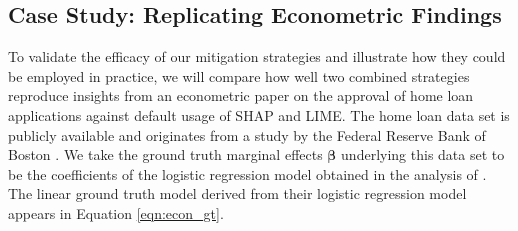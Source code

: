 \documentclass[12pt]{article}  %
\begin{document}
\vspace{-3mm}
\subsection{Case Study: Replicating Econometric Findings}
  \label{sec:case_study}\vspace{-3mm}
  To validate the efficacy of our mitigation strategies and illustrate how they could be employed in practice, we will compare how well two combined strategies reproduce insights from an econometric paper on the approval of home loan applications \citep{bane2006econometric} against default usage of SHAP and LIME. The home loan data set is publicly available and originates from a study by the Federal Reserve Bank of Boston \citep{hunter1996cultural}. We take the ground truth marginal effects $\boldsymbol{\beta}$ underlying this data set to be the coefficients of the logistic regression model obtained in the analysis of \cite{bane2006econometric}. 
  The linear ground truth model derived from their logistic regression model appears in Equation \ref{eqn:econ_gt}. 
\end{document}
